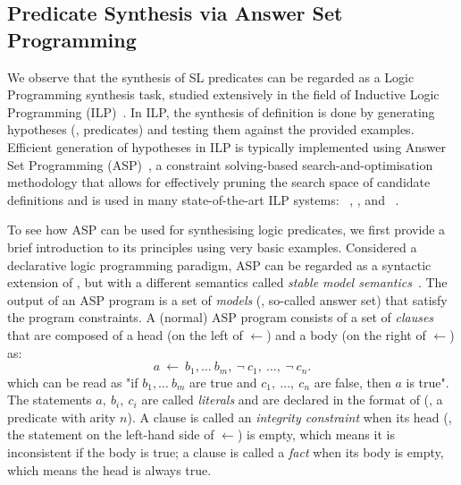 


\subsection{Predicate Synthesis via Answer Set Programming}
\label{sec:asp}

We observe that the synthesis of SL predicates can be regarded as a
Logic Programming synthesis task, studied extensively in the field of
Inductive Logic Programming
(ILP)~\cite{Muggleton91,cropper2020turning}. 
%
In ILP, the synthesis of definition is done by generating hypotheses
(\ie, predicates) and testing them against the provided examples.
%
Efficient generation of hypotheses in ILP is typically implemented
using Answer Set Programming (ASP)~\cite{gebser2022answer,aspguide}, a
constraint solving-based search-and-optimisation methodology that
allows for effectively pruning the search space of candidate
definitions and is used in many state-of-the-art ILP systems:
\aspal~\cite{corapi2011inductive}, \popper\cite{cropper2021learning},
and \aspsyn~\cite{bembenek2023smt}.

To see how ASP can be used for synthesising logic predicates, we first
provide a brief introduction to its principles using very basic
examples. 
%
Considered a declarative logic programming paradigm, ASP can be
regarded as a syntactic extension of , but with a
different semantics called \emph{stable model
  semantics}~\cite{gelfond1988stable}. The output of an ASP program is
a set of \emph{models} (\ie, so-called answer set) that satisfy the
program constraints. A (normal) ASP program consists of a set of
\emph{clauses} that are composed of a head (on the left of
$\leftarrow$) and a body (on the right of $\leftarrow$) as:
%
\[
   a\ \leftarrow\ b_1,\ldots\ b_m,\ \neg\ c_1,\ \ldots,\ \neg\ c_n.
\]
%
which can be read as "if $b_1,\ldots\ b_m$ are true and
$c_1,\ \ldots,\ c_n$ are false, then $a$ is true". 
The statements $a,~b_i,~c_i$ are called \emph{literals} and are
declared in the format of  (\ie, a
predicate with arity $n$). 
%
A clause is called an \emph{integrity constraint} when its head (\ie,
the statement on the left-hand side of $\leftarrow$) is empty, which
means it is inconsistent if the body is true; a clause is called a
\emph{fact} when its body is empty, which means the head is always
true.

